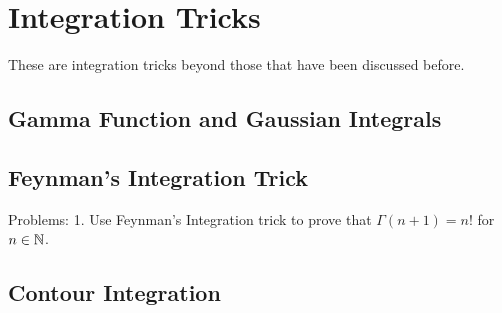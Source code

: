 \chapter{Integration Tricks}
These are integration tricks beyond those that have been discussed before.
\section{Gamma Function and Gaussian Integrals}
\section{Feynman's Integration Trick}
Problems:
1. Use Feynman's Integration trick to prove that \(\Gamma(n+1)=n!\) for \(n\in\mathbb{N}\).
\section{Contour Integration}
